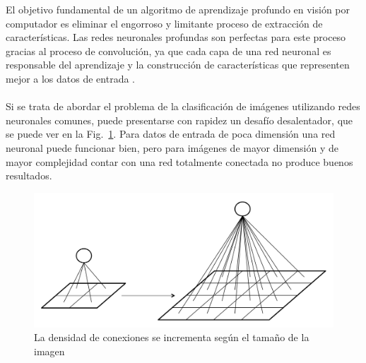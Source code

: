     El objetivo fundamental de un algoritmo de aprendizaje profundo en visión por computador es eliminar el engorroso y limitante proceso de extracción de características. Las redes neuronales profundas son perfectas para este proceso gracias al proceso de convolución, ya que cada capa de una red neuronal es responsable del aprendizaje y la construcción de características que representen mejor a los datos de entrada \cite{dlBook}.
    \\\\
    Si se trata de abordar el problema de la clasificación de imágenes utilizando redes neuronales comunes, puede presentarse con rapidez un desafío desalentador, que se puede ver en la Fig.~\ref{fig:fc_dont_scale}. Para datos de entrada de poca dimensión una red neuronal puede funcionar bien, pero para imágenes de mayor dimensión y de mayor complejidad contar con una red totalmente conectada no produce buenos resultados.
    \begin{figure}[htp]
        \centering
        \includegraphics[scale=0.35]{chapter3/fc_dont_scale.png}
        \caption{La densidad de conexiones se incrementa según el tamaño de la imagen}
        \label{fig:fc_dont_scale}
    \end{figure}

